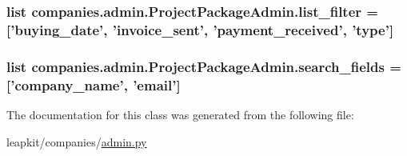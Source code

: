 \hypertarget{classcompanies_1_1admin_1_1_project_package_admin_a1c66536add091e10c5c0c00a658c99bc}{
\subsubsection[{list\-\_\-filter}]{\setlength{\rightskip}{0pt plus 5cm}list companies.\-admin.\-Project\-Package\-Admin.\-list\-\_\-filter = \mbox{[}'buying\-\_\-date', 'invoice\-\_\-sent', 'payment\-\_\-received', 'type'\mbox{]}\hspace{0.3cm}{\ttfamily [static]}}}\label{classcompanies_1_1admin_1_1_project_package_admin_a1c66536add091e10c5c0c00a658c99bc}
\hypertarget{classcompanies_1_1admin_1_1_project_package_admin_a856ebcb90b8a6fece0fc5ad8dca4b557}{
\subsubsection[{search\-\_\-fields}]{\setlength{\rightskip}{0pt plus 5cm}list companies.\-admin.\-Project\-Package\-Admin.\-search\-\_\-fields = \mbox{[}'company\-\_\-name', 'email'\mbox{]}\hspace{0.3cm}{\ttfamily [static]}}}\label{classcompanies_1_1admin_1_1_project_package_admin_a856ebcb90b8a6fece0fc5ad8dca4b557}


The documentation for this class was generated from the following file\-:\begin{DoxyCompactItemize}
\item 
leapkit/companies/\hyperlink{companies_2admin_8py}{admin.\-py}\end{DoxyCompactItemize}
